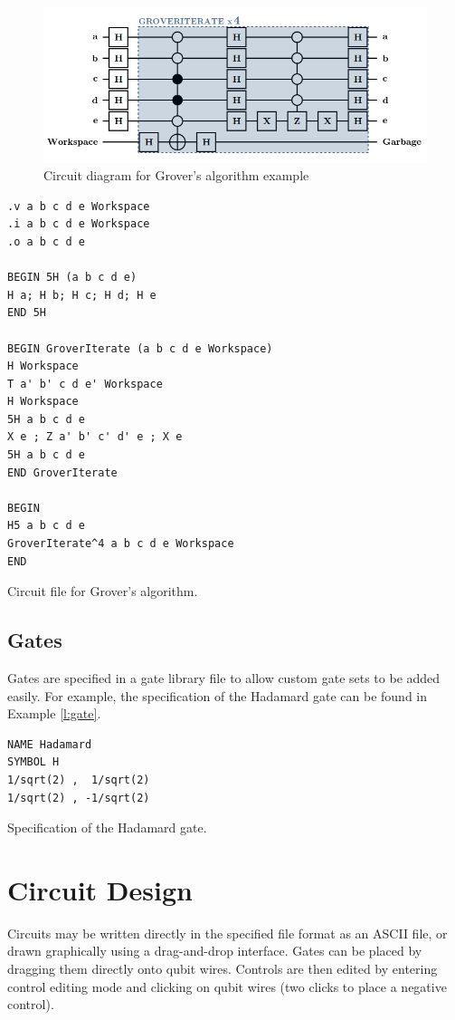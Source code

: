 \documentclass[aps,prl,reprint,floatfix,superscriptaddress]{revtex4-1} %
\begin{document}
\begin{figure}[ht]
\includegraphics[scale=0.47]{grover_circuit}
\caption{Circuit diagram for Grover's algorithm example}
\label{f:grover}
\end{figure}

\begin{program}
\begin{verbatim}
.v a b c d e Workspace
.i a b c d e Workspace
.o a b c d e

BEGIN 5H (a b c d e)
H a; H b; H c; H d; H e
END 5H

BEGIN GroverIterate (a b c d e Workspace)
H Workspace
T a' b' c d e' Workspace
H Workspace
5H a b c d e
X e ; Z a' b' c' d' e ; X e
5H a b c d e
END GroverIterate

BEGIN
H5 a b c d e
GroverIterate^4 a b c d e Workspace
END
\end{verbatim}
\caption{Circuit file for Grover's algorithm.}
\label{l:circuit}
\end{program}
\subsection{Gates}\label{sub:gates}
Gates are specified in a gate library file to allow custom gate sets to be added easily.
For example, the specification of the Hadamard gate can be found in Example \ref{l:gate}.
\begin{program}
\begin{verbatim}
NAME Hadamard
SYMBOL H
1/sqrt(2) ,  1/sqrt(2)
1/sqrt(2) , -1/sqrt(2)
\end{verbatim}
\caption{Specification of the Hadamard gate.}
\label{l:gate}
\end{program}
\section{Circuit Design}
Circuits may be written directly in the specified file format as an ASCII file, or drawn graphically using a drag-and-drop interface.  
Gates can be placed by dragging them directly onto qubit wires.
Controls are then edited by entering control editing mode and clicking on qubit wires (two clicks to place a negative control).
\end{document}

